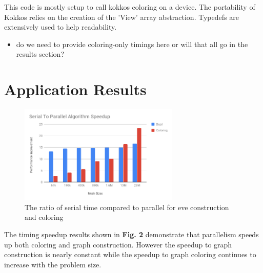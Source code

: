\documentclass[graybox]{svmult}
\begin{document}
This code is mostly setup to call kokkos coloring on a device.
The portability of Kokkos relies on the creation of the 'View' array
abstraction.
Typedefs are extensively used to help readability.

\begin{itemize}
  \item do we need to provide coloring-only timings here or will that all go in
    the results section?
\end{itemize}

\section{Application Results} \label{sec:results}

\begin{figure}[!ht]
	\centering
	\includegraphics[width=3in]{images/Parallel_Speedup.png}
	\caption{The ratio of serial time compared to parallel for eve construction and coloring }
	\label{fig:coloringSpeedup}
\end{figure}
The timing speedup results shown in \textbf{Fig. 2} demonstrate that parallelism speeds up both coloring and graph construction. However the speedup to graph construction is nearly constant while the speedup to graph coloring continues to increase with the problem size.
\end{document}
